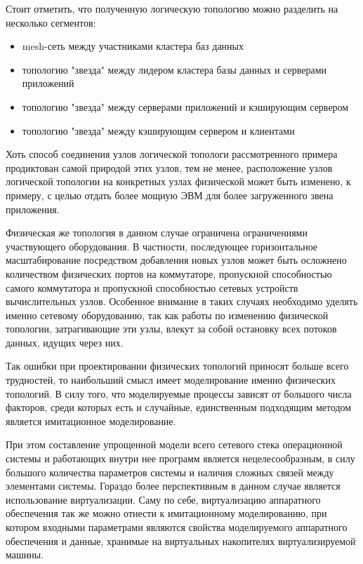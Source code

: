 Стоит отметить, что полученную логическую топологию можно разделить на несколько
сегментов:
\begin{itemize}
    \item mesh-сеть между участниками кластера баз данных
    \item топологию "звезда" между лидером кластера базы данных и серверами приложений
    \item топологию "звезда" между серверами приложений и кэширующим сервером
    \item топологию "звезда" между кэширующим сервером и клиентами
\end{itemize}

Хоть способ соединения узлов логической топологи рассмотренного примера продиктован 
самой природой этих узлов, тем не менее, расположение узлов логической топологии
на конкретных узлах физической может быть изменено, к примеру, с целью отдать более
мощную ЭВМ для более загруженного звена приложения.

Физическая же топология в данном случае ограничена ограничениями участвующего оборудования.
В частности, последующее горизонтальное масштабирование посредством добавления
новых узлов может быть осложнено количеством физических портов на коммутаторе, 
пропускной способностью самого коммутатора и пропускной способностью сетевых устройств
вычислительных узлов. Особенное внимание в таких случаях необходимо уделять именно
сетевому оборудованию, так как работы по изменению физической топологии, затрагивающие
эти узлы, влекут за собой остановку всех потоков данных, идущих через них.

Так ошибки при проектировании физических топологий приносят больше всего трудностей, 
то наибольший смысл имеет моделирование именно физических топологий.
В силу того, что моделируемые процессы зависят от большого числа факторов, 
среди которых есть и случайные, единственным подходящим методом является 
имитационное моделирование.

При этом составление упрощенной модели всего сетевого стека операционной системы и 
работающих внутри нее программ является нецелесообразным, в силу большого количества
параметров системы и наличия сложных связей между элементами системы. Гораздо более
перспективным в данном случае является использование виртуализации. Саму по себе, 
виртуализацию аппаратного обеспечения так же можно отнести к имитационному моделированию,
при котором входными параметрами являются свойства моделируемого аппаратного обеспечения
и данные, хранимые на виртуальных накопителях виртуализируемой машины.

